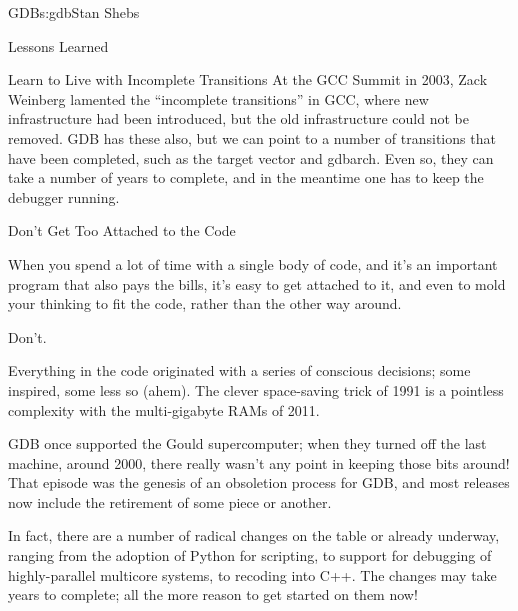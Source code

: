 \begin{aosachapter}{GDB}{s:gdb}{Stan Shebs}
\begin{aosasect1}{Lessons Learned}
\begin{aosasect2}{Learn to Live with Incomplete Transitions}
At the GCC Summit in 2003, Zack Weinberg lamented the ``incomplete
transitions'' in GCC, where new infrastructure had been introduced,
but the old infrastructure could not be removed.  GDB has these also,
but we can point to a number of transitions that have been completed,
such as the target vector and gdbarch.  Even so, they can take a
number of years to complete, and in the meantime one has to keep the
debugger running.

\end{aosasect2}

\begin{aosasect2}{Don't Get Too Attached to the Code}

When you spend a lot of time with a single body of code, and it's an
important program that also pays the bills, it's easy to get attached
to it, and even to mold your thinking to fit the code, rather than the
other way around.

Don't.

Everything in the code originated with a series of conscious
decisions; some inspired, some less so (ahem).  The clever
space-saving trick of 1991 is a pointless complexity with the
multi-gigabyte RAMs of 2011.

GDB once supported the Gould supercomputer; when they turned off the
last machine, around 2000, there really wasn't any point in keeping
those bits around!  That episode was the genesis of an obsoletion
process for GDB, and most releases now include the retirement of
some piece or another.

In fact, there are a number of radical changes on the table or already
underway, ranging from the adoption of Python for scripting, to
support for debugging of highly-parallel multicore systems, to
recoding into C++.  The changes may take years to complete; all the
more reason to get started on them now!

\end{aosasect2}

\end{aosasect1}


\end{aosachapter}
